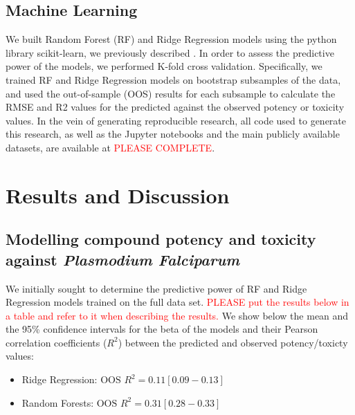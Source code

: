 \documentclass{article}
\begin{document}
\subsection{Machine Learning}
We built Random Forest (RF) and Ridge Regression models using the python library scikit-learn\cite{scikit}, we previously described \citep{et1:}.
In order to assess the predictive power of the models, we performed K-fold cross validation. Specifically, 
we trained RF and Ridge Regression models on bootstrap subsamples of the data, and used the out-of-sample (OOS) results for each subsample to calculate the RMSE and R2 values for the predicted against the observed potency or toxicity values.
In the vein of generating reproducible research\cite{Walters2013,Landrum2012}, all code used to generate this research, as well as the Jupyter notebooks and the main publicly available datasets, are available at \textcolor{red}{PLEASE COMPLETE}.




\section{Results and Discussion}

\subsection{Modelling compound potency and toxicity against {\it Plasmodium Falciparum}
}

We initially sought to determine the predictive power of RF and Ridge Regression models trained on the full data set.
\textcolor{red}{PLEASE put the results below in a table and refer to it when describing the results.}
We show below the mean and the 95\% confidence intervals for the beta of the models and their Pearson correlation coefficients ($R^2$) between the predicted and observed potency/toxicty values:
\begin{itemize}
    \item Ridge Regression: $\text{OOS } R^2 = 0.11 [0.09-0.13]$
    \item Random Forests: $\text{OOS } R^2 = 0.31 [0.28-0.33]$
\end{itemize}
\end{document}
